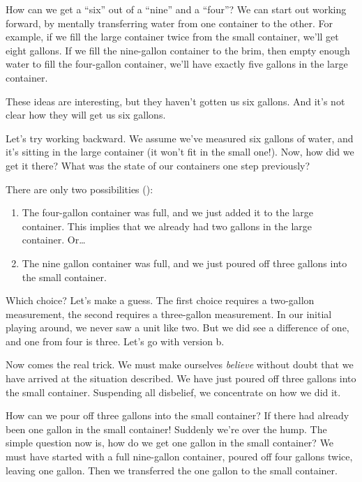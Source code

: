 How can we get a ``six'' out of a ``nine'' and a ``four''? We can
start out working forward, by mentally
transferring water from one container to the other. For example, if we
fill the large container twice from the small container, we'll get
eight gallons. If we fill the nine-gallon container to the brim, then
empty enough water to fill the four-gallon container, we'll have
exactly five gallons in the large container.

These ideas are interesting, but they haven't gotten us six gallons.
And it's not clear how they will get us six gallons.

Let's try working backward.
We assume we've measured six gallons
of water, and it's sitting in the large container (it won't fit in the
small one!). Now, how did we get it there? What was the state of our
containers one step previously?

There are only two possibilities ():
\begin{enumerate}
\item The four-gallon container was full, and we just added it to the large
   container. This implies that we already had two gallons in the large
   container. Or\dots{}
\item The nine gallon container was full, and we just poured off three gallons
   into the small container.
\end{enumerate}
Which choice? Let's make a guess. The first choice requires a two-gallon
measurement, the second requires a three-gallon measurement. In our initial
playing around, we never saw a unit like two. But we did see a difference
of one, and one from four is three. Let's go with version b.

Now comes the real trick. We must make ourselves \emph{believe} without
doubt that we have arrived at the situation described. We have just
poured off three gallons into the small container. Suspending all disbelief,
we concentrate on how we did it.

How can we pour off three gallons into the small container? If there
had already been one gallon in the small container! Suddenly we're over
the hump. The simple question now is, how do we get one gallon in the
small container? We must have started with a full nine-gallon container,
poured off four gallons twice, leaving one gallon. Then we transferred the
one gallon to the small container.

